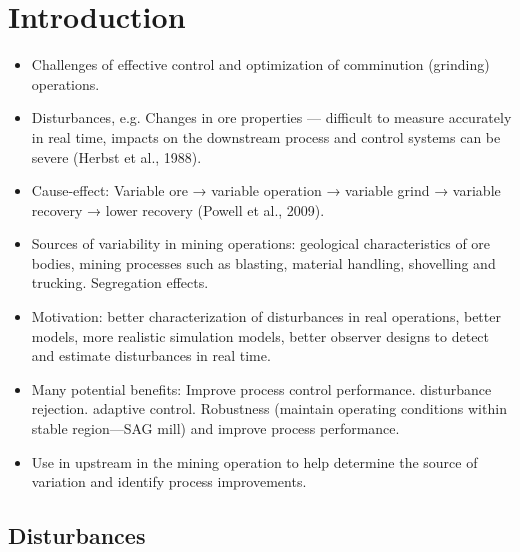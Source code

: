 \chapter*{Introduction}         %
\label{chap-introduction}       %


\begin{itemize}
	\item Challenges of effective control and optimization of comminution (grinding) operations.
	\item Disturbances, e.g. Changes in ore properties — difficult to measure accurately in real time, impacts on the downstream process and control systems can be severe (Herbst et al., 1988).
	\item Cause-effect: Variable ore → variable operation → variable grind → variable recovery → lower recovery (Powell et al., 2009).
	\item Sources of variability in mining operations: geological characteristics of ore bodies, mining processes such as blasting, material handling, shovelling and trucking. Segregation effects.
	\item Motivation: better characterization of disturbances in real operations, better models, more realistic simulation models, better observer designs to detect and estimate disturbances in real time.
	\item Many potential benefits: Improve process control performance. disturbance rejection. adaptive control. Robustness (maintain operating conditions within stable region—SAG mill) and improve process performance.
	\item Use in upstream in the mining operation to help determine the source of variation and identify process improvements.
\end{itemize}

\section*{Disturbances}

